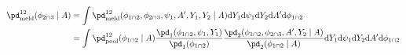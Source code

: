 \begin{align}
  \pd_{\text{meld}}^{12} (\phi_{2 \cap 3} \mid A) &= 
    \int
      \pd_{\text{meld}}^{12}(\phi_{1 \cap 2}, \phi_{2 \cap 3}, \psi_{1}, A', Y_{1}, Y_{2} \mid A)
    \text{d} Y_{1}
    \text{d} \psi_{1}
    \text{d} Y_{2}
    \text{d} A'
    \text{d} \phi_{1 \cap 2} \\
  &= 
    \int
      \pd_{\text{pool}}^{12}(\phi_{1 \cap 2} \mid A)
      \frac {
        \pd_{1}(\phi_{1 \cap 2}, \psi_{1}, Y_{1})
      } {
        \pd_{1}(\phi_{1 \cap 2})
      }
      \frac {
        \pd_{2}(\phi_{1 \cap 2}, \phi_{2 \cap 3}, A', Y_{2} \mid A)
      } {
        \pd_{2}(\phi_{1 \cap 2} \mid A)
      }
    \text{d} Y_{1}
    \text{d} \psi_{1}
    \text{d} Y_{2}
    \text{d} A'
    \text{d} \phi_{1 \cap 2}
  \label{eqn:conditional-commutativity}
\end{align}
